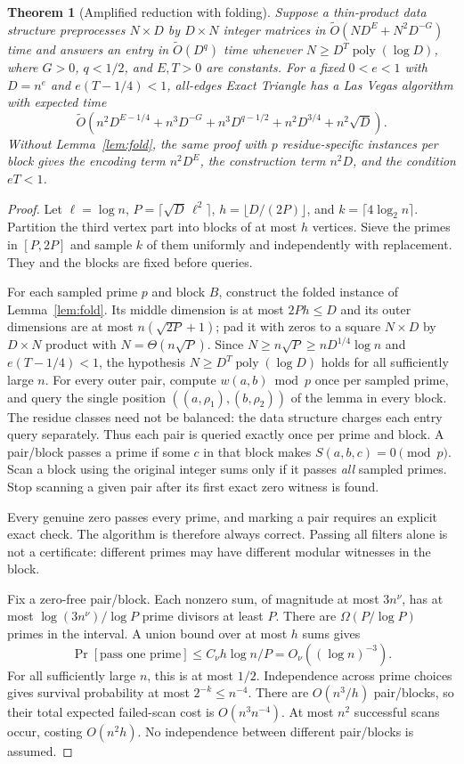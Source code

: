 \documentclass[11pt]{article}
\newtheorem{theorem}{Theorem}
\newcommand{\softO}{\widetilde O}
\begin{document}
\begin{theorem}[Amplified reduction with folding]
\label{thm:amplified}
Suppose a thin-product data structure preprocesses $N\times D$ by
$D\times N$ integer matrices in $\softO(ND^E+N^2D^{-G})$ time and answers
an entry in $\softO(D^q)$ time whenever $N\ge D^T\operatorname{poly}(\log D)$,
where $G>0$, $q<1/2$, and $E,T>0$ are constants. For a fixed $0<e<1$
with $D=n^e$ and $e(T-1/4)<1$, all-edges Exact Triangle has a Las Vegas
algorithm with expected time
\[
\softO\left(n^2D^{E-1/4}+n^3D^{-G}+n^3D^{q-1/2}+n^2D^{3/4}+n^2\sqrt D\right).
\tag{6}
\]
Without Lemma~\ref{lem:fold}, the same proof with $p$ residue-specific
instances per block gives the encoding term $n^2D^E$, the construction term
$n^2D$, and the condition $eT<1$.
\end{theorem}
\begin{proof}
Let $\ell=\log n$, $P=\lceil\sqrt D\,\ell^2\rceil$,
$h=\lfloor D/(2P)\rfloor$, and $k=\lceil4\log_2 n\rceil$.
Partition the third vertex part into blocks of at most $h$ vertices.
Sieve the primes in $[P,2P]$ and sample $k$ of them uniformly and
independently with replacement. They and the blocks are fixed before queries.

For each sampled prime $p$ and block $B$, construct the folded instance of
Lemma~\ref{lem:fold}. Its middle dimension is at most $2Ph\le D$ and its
outer dimensions are at most $n(\sqrt{2P}+1)$; pad it with zeros to a square
$N\times D$ by $D\times N$ product with $N=\Theta(n\sqrt P)$. Since
$N\ge n\sqrt P\ge nD^{1/4}\log n$ and $e(T-1/4)<1$, the hypothesis
$N\ge D^T\operatorname{poly}(\log D)$ holds for all sufficiently large $n$. For every outer pair, compute
$w(a,b)\bmod p$ once per sampled prime, and query the single position
$((a,\rho_1),(b,\rho_2))$ of the lemma in every block. The residue classes
need not be balanced: the data structure charges each entry query
separately. Thus each pair is queried exactly once per prime and block.
A pair/block passes a prime if some $c$ in that block
makes $S(a,b,c)=0\pmod p$. Scan a block using the original integer sums
only if it passes \emph{all} sampled primes. Stop scanning a given pair
after its first exact zero witness is found.

Every genuine zero passes every prime, and marking a pair requires an
explicit exact check. The algorithm is therefore always correct. Passing
all filters alone is not a certificate: different primes may have different
modular witnesses in the block.

Fix a zero-free pair/block. Each nonzero sum, of magnitude at most
$3n^\nu$, has at most $\log(3n^\nu)/\log P$ prime divisors at least $P$.
There are $\Omega(P/\log P)$ primes in the interval. A union bound over
at most $h$ sums gives
\[
\Pr[\text{pass one prime}]
\le C_\nu h\log n/P=O_\nu((\log n)^{-3}).
\]
For all sufficiently large $n$, this is at most $1/2$. Independence across
prime choices gives survival probability at most $2^{-k}\le n^{-4}$.
There are $O(n^3/h)$ pair/blocks, so their total expected failed-scan cost
is $O(n^3n^{-4})$. At most $n^2$ successful scans occur, costing $O(n^2h)$.
No independence between different pair/blocks is assumed.


\end{proof}
\end{document}
